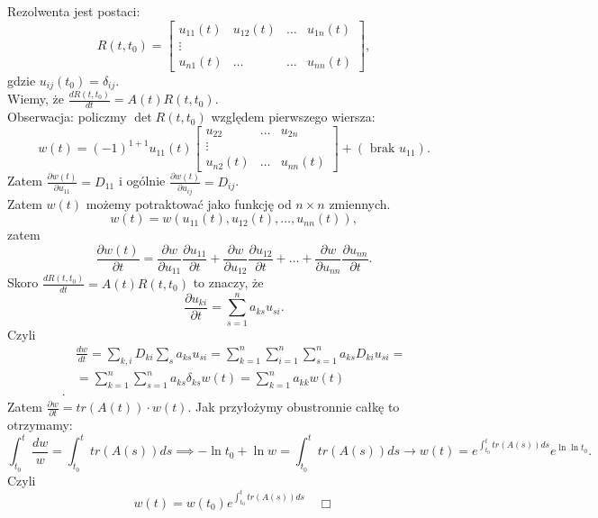 \documentclass[../main.tex]{subfiles}
\begin{document}
        \begin{dowod}
            Rezolwenta jest postaci:
            \[
                R(t,t_0) = \begin{bmatrix} u_{11}(t) & u_{12}(t) & \ldots & u_{1n}(t)\\ \vdots \\ u_{n1}(t) & \ldots & \ldots & u_{nn}(t)\end{bmatrix}
            ,\]
            gdzie $u_{ij}(t_0) = \delta_{ij}$.\\
            Wiemy, że $\frac{d R(t,t_0)}{dt} = A(t) R(t,t_0)$.\\
            Obserwacja: policzmy $\det R(t,t_0)$ względem pierwszego wiersza:
            \[
                w(t) = (-1)^{1+1}u_{11}(t) \begin{bmatrix} u_{22} & \ldots & u_{2n} \\ \vdots \\ u_{n2}(t) & \ldots & u_{nn}(t) \end{bmatrix} + (\text{ brak  }u_{11})
            .\]
            Zatem $\frac{\partial w(t)}{\partial u_{11}} = D_{11}$ i ogólnie $\frac{\partial w(t)}{\partial u_{ij}} = D_{ij}$.\\
            Zatem $w(t)$ możemy potraktować jako funkcję od $n\times n$ zmiennych.
            \[
                w(t) = w(u_{11}(t), u_{12}(t), \ldots, u_{nn}(t))
            ,\]
            zatem
            \[
                \frac{\partial w(t)}{\partial t} = \frac{\partial w}{\partial u_{11}} \frac{\partial u_{11}}{\partial t} + \frac{\partial w}{\partial u_{12}} \frac{\partial u_{12}}{\partial t} +\ldots+ \frac{\partial w}{\partial u_{nn}} \frac{\partial u_{nn}}{\partial t}
            .\]
            Skoro $\frac{d R(t,t_0)}{dt} = A(t) R(t,t_0)$ to znaczy, że
            \[
                \frac{\partial u_{ki}}{\partial t} = \sum_{s=1}^n a_{ks}u_{si}
            .\]
            Czyli
            \begin{align*}
                &\frac{d w}{dt} = \sum_{k,i}D_{ki} \sum_s a_{ks}u_{si} = \sum_{k=1}^n \sum_{i=1}^n \sum_{s=1}^n a_{ks} D_{ki}u_{si} =\\
                &= \sum_{k=1}^n\sum_{s=1}^n a_{ks}\delta_{ks}w(t) = \sum_{k=1}^n a_{kk}w(t)\\
            .\end{align*}
            Zatem $\frac{\partial w}{\partial t} = tr(A(t))\cdot  w(t)$. Jak przyłożymy obustronnie całkę to otrzymamy:
            \[
                \int_{t_0}^t \frac{dw}{w} = \int_{t_0}^t tr(A(s))ds \implies -\ln t_0 + \ln w = \int_{t_0}^t tr(A(s))ds \to w(t) = e^{\int_{t_0}^t tr(A(s))ds}e^{\ln \ln t_0}
            .\]
            Czyli
            \[
                w(t) = w(t_0) e^{\int_{t_0}^t tr(A(s))ds}\quad\Box
            \]
        \end{dowod}
\end{document}
